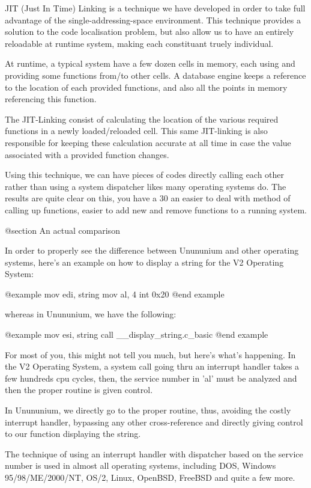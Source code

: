  JIT (Just In Time) Linking is a technique we have developed in order to take
 full advantage of the single-addressing-space environment.  This technique
 provides a solution to the code localisation problem, but also allow us to
 have an entirely reloadable at runtime system, making each constituant truely
 individual.

 At runtime, a typical system have a few dozen cells in memory, each using
 and providing some functions from/to other cells.  A database engine keeps
 a reference to the location of each provided functions, and also all the
 points in memory referencing this function.

 The JIT-Linking consist of calculating the location of the various required
 functions in a newly loaded/reloaded cell.  This same JIT-linking is also
 responsible for keeping these calculation accurate at all time in case the
 value associated with a provided function changes.

 Using this technique, we can have pieces of codes directly calling each other
 rather than using a system dispatcher likes many operating systems do.  The
 results are quite clear on this, you have a 30%
 an easier to deal with method of calling up functions, easier to add new
 and remove functions to a running system.

@section An actual comparison

 In order to properly see the difference between Unununium and other operating
 systems, here's an example on how to display a string for the V2 Operating
 System:
 
 @example
 mov edi, string
 mov al, 4
 int 0x20
 @end example

 whereas in Unununium, we have the following:
 
 @example
 mov esi, string
 call __display_string.c_basic
 @end example

 For most of you, this might not tell you much, but here's what's happening.
 In the V2 Operating System, a system call going thru an interrupt handler
 takes a few hundreds cpu cycles, then, the service number in 'al' must be
 analyzed and then the proper routine is given control.

 In Unununium, we directly go to the proper routine, thus, avoiding the costly
 interrupt handler, bypassing any other cross-reference and directly giving
 control to our function displaying the string.

 The technique of using an interrupt handler with dispatcher based on the
 service number is used in almost all operating systems, including DOS, Windows
 95/98/ME/2000/NT, OS/2, Linux, OpenBSD, FreeBSD and quite a few more.


